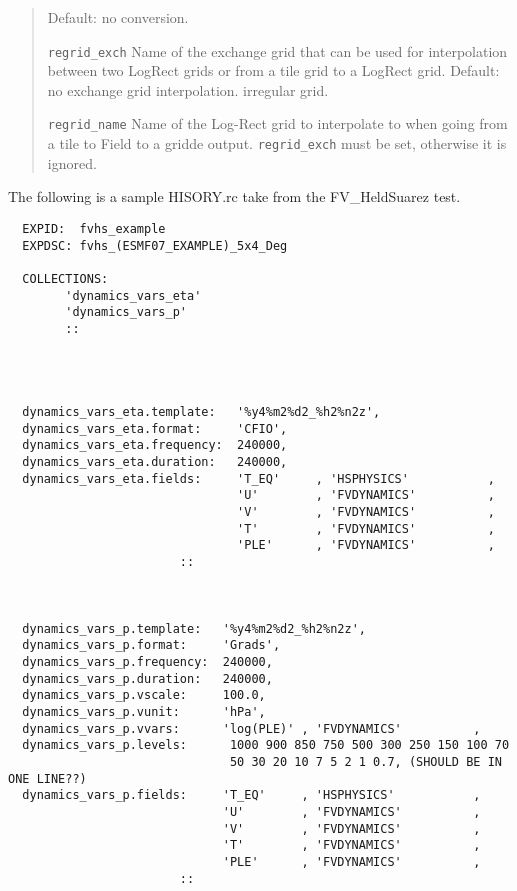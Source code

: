 \begin{quote}
\begin{trivlist}
                          Default: no conversion.
 \item[\tt regrid\_exch]  Name of the exchange grid that can be used for interpolation
                          between two LogRect grids or from a tile grid to a LogRect grid.
                          Default: no exchange grid interpolation.
                          irregular grid.
 \item[\tt regrid\_name]  Name of the Log-Rect grid to interpolate to when going from a tile 
                          to Field to a gridde output. {\tt regrid\_exch} must be set, otherwise
                          it is ignored.
\end{trivlist}
\end{quote}

 The following is a sample HISORY.rc take from the FV\_HeldSuarez test.
 \begin{verbatim}
  EXPID:  fvhs_example
  EXPDSC: fvhs_(ESMF07_EXAMPLE)_5x4_Deg

  COLLECTIONS:
        'dynamics_vars_eta'
        'dynamics_vars_p'
        ::
 
 
 
 
  dynamics_vars_eta.template:   '%y4%m2%d2_%h2%n2z',
  dynamics_vars_eta.format:     'CFIO',
  dynamics_vars_eta.frequency:  240000,
  dynamics_vars_eta.duration:   240000,
  dynamics_vars_eta.fields:     'T_EQ'     , 'HSPHYSICS'           ,
                                'U'        , 'FVDYNAMICS'          ,
                                'V'        , 'FVDYNAMICS'          ,
                                'T'        , 'FVDYNAMICS'          ,
                                'PLE'      , 'FVDYNAMICS'          ,
                        ::
 
 
 
  dynamics_vars_p.template:   '%y4%m2%d2_%h2%n2z',
  dynamics_vars_p.format:     'Grads',
  dynamics_vars_p.frequency:  240000,
  dynamics_vars_p.duration:   240000,
  dynamics_vars_p.vscale:     100.0,
  dynamics_vars_p.vunit:      'hPa',
  dynamics_vars_p.vvars:      'log(PLE)' , 'FVDYNAMICS'          ,   
  dynamics_vars_p.levels:      1000 900 850 750 500 300 250 150 100 70 
                               50 30 20 10 7 5 2 1 0.7, (SHOULD BE IN ONE LINE??)
  dynamics_vars_p.fields:     'T_EQ'     , 'HSPHYSICS'           ,
                              'U'        , 'FVDYNAMICS'          ,
                              'V'        , 'FVDYNAMICS'          ,
                              'T'        , 'FVDYNAMICS'          ,
                              'PLE'      , 'FVDYNAMICS'          ,
                        ::
 \end{verbatim}

